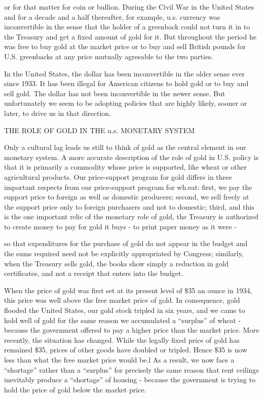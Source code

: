 \documentclass[11pt,openany]{book}
\begin{document}
or for that matter for coin or bullion. During the Civil War in the United States and for a decade and a half thereafter, for example, u.s. currency was inconvertible in the sense that the holder of a greenback could not turn it in to the Treasury and get a fixed amount of gold for it. But throughout the period he was free to buy gold at the market price or to buy and sell British pounds for U.S. greenbacks at any price mutually agreeable to the two parties.

In the United States, the dollar has been inconvertible in the older sense ever since 1933. It has been illegal for American citizens to hold gold or to buy and sell gold. The dollar has not been inconvertible in the newer sense. But unfortunately we seem to be adopting policies that are highly likely, sooner or later, to drive us in that direction.

THE ROLE OF GOLD IN THE u.s. MONETARY SYSTEM

Only a cultural lag leads us still to think of gold as the central element in our monetary system. A more accurate description of the role of gold in U.S. policy is that it is primarily a commodity whose price is supported, like wheat or other agricultural products. Our price-support program for gold differs in three important respects from our price-support program for wh.eat: first, we pay the support price to foreign as well as domestic producers; second, we sell freely at the support price only to foreign purchasers and not to domestic; third, and this is the one important relic of the monetary role of gold, the Treasury is authorized to create money to pay for gold it buys - to print paper money as it were -

so that expenditures for the purchase of gold do not appear in the budget and the sums required need not be explicitly appropriated by Congress; similarly, when the Treasury sells gold, the books show simply a reduction in gold certificates, and not a receipt that enters into the budget.

When the price of gold was first set at its present level of \$35 an ounce in 1934, this price was well above the free market price of gold. In consequence, gold flooded the United States, our gold stock tripled in six years, and we came to hold well of gold for the same reason we accumulated a ``surplus'' of wheat - because the government offered to pay a higher price than the market price. More recently, the situation has changed. While the legally fixed price of gold has remained \$35, prices of other goods have doubled or tripled. Hence \$35 is now less than what the free market price would be.l As a result, we now face a ``shortage'' rather than a ``surplus'' for precisely the same reason that rent ceilings inevitably produce a ``shortage'' of housing - because the government is trying to hold the price of gold below the market price.
\end{document}
